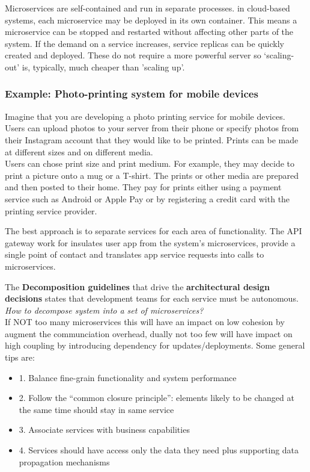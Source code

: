 \documentclass[10pt,a4paper]{report}
\begin{document}
Microservices are self-contained and run in separate processes. in cloud-based systems, each microservice may be deployed in its own container. This means a microservice can be stopped and restarted without affecting other parts of the system.
If the demand on a service increases, service replicas can be quickly created and deployed. These do not require a more powerful server so ‘scaling-out’ is, typically, much cheaper than ’scaling up’.

\subsubsection{Example: Photo-printing system for mobile devices}
Imagine that you are developing a photo printing service for mobile devices.
Users can upload photos to your server from their phone or specify photos from
their Instagram account that they would like to be printed. Prints can be made at different sizes and on different media.\\
Users can chose print size and print medium. For example, they may decide to print a picture onto a mug or a T-shirt. The prints or other media are prepared and then posted to their home. They pay for prints either using a payment service
such as Android or Apple Pay or by registering a credit card with the printing service provider.

The best approach is to separate services for each area of functionality. The API gateway work for insulates user app from the system’s microservices, provide a single point of contact and translates app service requests into calls to microservices.

The \textbf{Decomposition guidelines} that drive the \textbf{architectural design decisions} states that development teams for each service must be autonomous.\\
\textit{How to decompose system into a set of microservices?}\\
If NOT too many microservices this will have an impact on low cohesion by augment the communciation overhead, dually not too few will have impact on high coupling by introducing dependency for updates/deployments.
Some general tips are:
\begin{itemize}
	\item 1. Balance fine-grain functionality and system performance
	\item 2. Follow the “common closure principle”: elements likely to be changed at the same time should stay in same service
	\item 3. Associate services with business capabilities
	\item 4. Services should have access only the data they need plus supporting data propagation mechanisms
	
\end{itemize}
\end{document}
